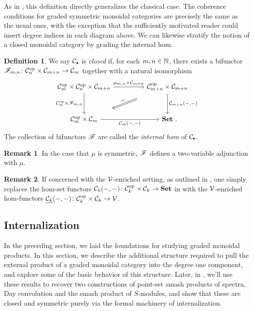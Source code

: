 \documentclass[openany, amssymb, psamsfonts]{amsart}
\theoremstyle{definition}
\newtheorem{defn}{Definition}[section]
\newtheorem{rem}{Remark}[section]
\numberwithin{equation}{section}
\begin{document}
As in , this definition directly generalizes the classical case. The coherence conditions for graded symmetric monoidal categories are precisely the same as the usual ones, with the exception that the sufficiently motivated reader could insert degree indices in each diagram above. We can likewise stratify the notion of a closed monoidal category by grading the internal hom.

\begin{defn} \label{def:closed_monoidal}
We say $\C_\sbull$ is \emph{closed} if, for each $m, n \in \mathbb{N}$, there exists a bifunctor $\mathscr{F}_{m, n} \colon \mathcal{C}_n^{\mathrm{op}} \times \mathcal{C}_{m + n} \to \mathcal{C}_m$ together with a natural isomorphism
\begin{equation*}
    \begin{tikzcd}[column sep = 4.5em, row sep = 3em]
        \C_m^\op \times \C_n^\op \times \C_{m + n} \ar[r, "\mu_{m, n} \times \C_{m + n}"] \ar[d, "\C_m^\op \times \scF_{m, n}"'] & \C_{m + n}^\op \times \C_{m + n} \ar[d, "{\C_{m + n}(-, -)}"] \ar[dl, Rightarrow, shorten >= 5ex, shorten <= 5ex, "\sim" {yshift = 1em, rotate = 27, xshift = -1em}] \\
        \C_m^\op \times \C_m \ar[r, "{\C_m(-, -)}"'] & \Set \period
    \end{tikzcd}
\end{equation*}
 The collection of bifunctors $\mathscr{F}$ are called the \emph{internal hom} of $\C_\sbull$.
\end{defn}

\begin{rem}
In the case that $\mu$ is symmetric, $\mathscr{F}$ defines a two-variable adjunction with $\mu$.
\end{rem}

\begin{rem} \label{rem:enriched_closed}
    If concerned with the $\mathcal{V}$-enriched setting, as outlined in , one simply replaces the hom-set functors $\mathcal{C}_k(-, -)\colon \mathcal{C}_k^{\mathrm{op}} \times \mathcal{C}_k \to \textbf{\textup{Set}}$ in  with the $\mathcal{V}$-enriched hom-functors $\underline{\mathcal{C}_k}(-, -) \colon \mathcal{C}_k^{\mathrm{op}} \times \mathcal{C}_k \to \mathcal{V}$.
\end{rem}

\subsection{Internalization}
\label{subsection:internalization}

In the preceding section, we laid the foundations for studying graded monoidal products. In this section, we describe the additional structure required to pull the external product of a graded monoidal category into the degree one component, and explore some of the basic behavior of this structure. Later, in , we'll use these results to recover two constructions of point-set smash products of spectra, Day convolution and the smash product of $S$-modules, and show that these are closed and symmetric purely via the formal machinery of internalization.
\end{document}
